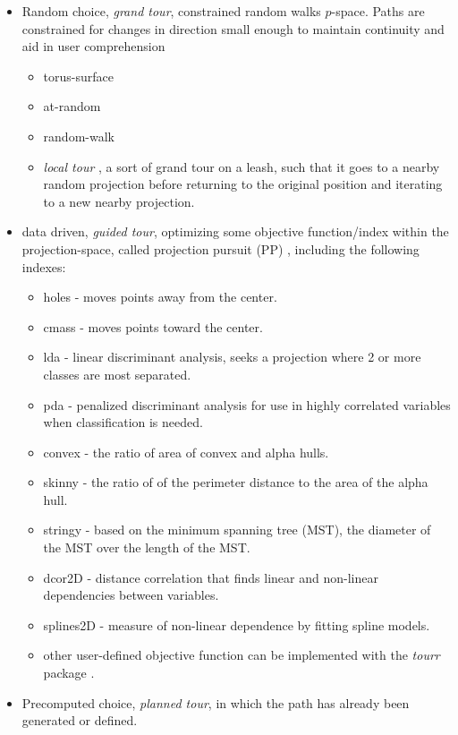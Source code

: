 \documentclass{monashthesis}
\begin{document}
\begin{itemize}
\tightlist
\item
  Random choice, \emph{grand tour}, constrained random walks
  \(p\)-space. Paths are constrained for changes in direction small
  enough to maintain continuity and aid in user comprehension

  \begin{itemize}
  \tightlist
  \item
    torus-surface \autocite{asimov_grand_1985}
  \item
    at-random \autocite{asimov_grand_1985}
  \item
    random-walk \autocite{asimov_grand_1985}
  \item
    \emph{local tour} \autocite{wickham_tourr_2011}, a sort of grand
    tour on a leash, such that it goes to a nearby random projection
    before returning to the original position and iterating to a new
    nearby projection.
  \end{itemize}
\item
  data driven, \emph{guided tour}, optimizing some objective
  function/index within the projection-space, called projection pursuit
  (PP) \autocite{hurley_analyzing_1990}, including the following
  indexes:

  \begin{itemize}
  \tightlist
  \item
    holes \autocite{cook_projection_1993} - moves points away from the
    center.
  \item
    cmass \autocite{cook_projection_1993} - moves points toward the
    center.
  \item
    lda \autocite{lee_projection_2005} - linear discriminant analysis,
    seeks a projection where 2 or more classes are most separated.
  \item
    pda \autocite{lee_projection_2010} - penalized discriminant analysis
    for use in highly correlated variables when classification is
    needed.
  \item
    convex \autocite{laa_using_2019} - the ratio of area of convex and
    alpha hulls.
  \item
    skinny \autocite{laa_using_2019} - the ratio of of the perimeter
    distance to the area of the alpha hull.
  \item
    stringy \autocite{laa_using_2019} - based on the minimum spanning
    tree (MST), the diameter of the MST over the length of the MST.
  \item
    dcor2D \autocites{grimm_mbgraphic:_2017}{laa_using_2019} - distance
    correlation that finds linear and non-linear dependencies between
    variables.
  \item
    splines2D \autocites{grimm_mbgraphic:_2017}{laa_using_2019} -
    measure of non-linear dependence by fitting spline models.
  \item
    other user-defined objective function can be implemented with the
    \emph{tourr} package \textcite{wickham_tourr_2011}.
  \end{itemize}
\item
  Precomputed choice, \emph{planned tour}, in which the path has already
  been generated or defined.


\end{itemize}
\end{document}
